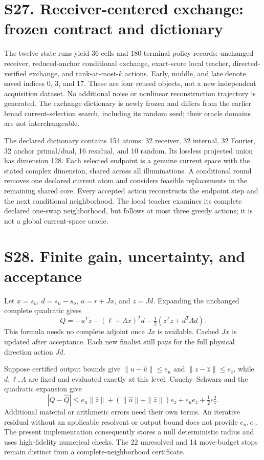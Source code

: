 
\clearpage
\section*{S27. Receiver-centered exchange: frozen contract and dictionary}

The twelve state runs yield 36 cells and 180 terminal policy records: unchanged receiver, reduced-anchor conditional exchange, exact-score local teacher, directed-verified exchange, and rank-at-most-$k$ actions. Early, middle, and late denote saved indices 0, 3, and 17. These are four reused objects, not a new independent acquisition dataset. No additional noise or nonlinear reconstruction trajectory is generated. The exchange dictionary is newly frozen and differs from the earlier broad current-selection search, including its random seed; their oracle domains are not interchangeable.

The declared dictionary contains 154 atoms: 32 receiver, 32 internal, 32 Fourier, 32 anchor primal/dual, 16 residual, and 10 random. Its lossless projected union has dimension 128. Each selected endpoint is a genuine current space with the stated complex dimension, shared across all illuminations. A conditional round removes one declared current atom and considers feasible replacements in the remaining shared core. Every accepted action reconstructs the endpoint step and the next conditional neighborhood. The local teacher examines its complete declared one-swap neighborhood, but follows at most three greedy actions; it is not a global current-space oracle.

\section*{S28. Finite gain, uncertainty, and acceptance}
Let $x=s_o$, $d=s_n-s_o$, $u=r+Jx$, and $z=Jd$. Expanding the unchanged complete quadratic gives
\[
Q=-u^Tz-(\ell+\Lambda x)^Td
-\tfrac12(z^Tz+d^T\Lambda d).
\]
This formula needs no complete adjoint once $Jx$ is available. Cached $Jx$ is updated after acceptance. Each new finalist still pays for the full physical direction action $Jd$.

Suppose certified output bounds give $\|u-\hat u\|\le e_u$ and $\|z-\hat z\|\le e_z$, while $d,\ell,\Lambda$ are fixed and evaluated exactly at this level. Cauchy--Schwarz and the quadratic expansion give
\[
|Q-\hat Q|\le e_u\|\hat z\|
+(\|\hat u\|+\|\hat z\|)e_z
+e_ue_z+\tfrac12e_z^2.
\]
Additional material or arithmetic errors need their own terms. An iterative residual without an applicable resolvent or output bound does not provide $e_u,e_z$. The present implementation consequently stores a null deterministic radius and uses high-fidelity numerical checks. The 22 unresolved and 14 move-budget stops remain distinct from a complete-neighborhood certificate.

